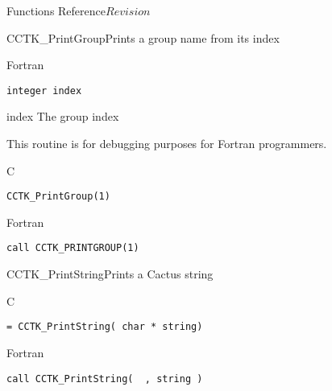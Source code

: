 \begin{cactuspart}{ Functions Reference}{}{$Revision$}
\begin{FunctionDescription}{CCTK\_PrintGroup}{Prints a group name from its index}
\begin{SynopsisSection}
\begin{Synopsis}{Fortran}
\begin{verbatim}
integer index\end{verbatim}
\end{Synopsis}
\end{SynopsisSection}
\begin{ParameterSection}
\begin{Parameter}{index}
The group index
\end{Parameter}
\end{ParameterSection}
\begin{Discussion}
This routine is for debugging purposes for Fortran programmers.
\end{Discussion}
\begin{ExampleSection}
\begin{Example}{C}
\begin{verbatim}
CCTK_PrintGroup(1)
\end{verbatim}
\end{Example}
\begin{Example}{Fortran}
\begin{verbatim}
call CCTK_PRINTGROUP(1)
\end{verbatim}
\end{Example}
\end{ExampleSection}
\end{FunctionDescription}

\begin{FunctionDescription}{CCTK\_PrintString}{Prints a Cactus string}
\label{CCTK-PrintString}
\begin{SynopsisSection}
\begin{Synopsis}{C}
\begin{verbatim}= CCTK_PrintString( char * string)\end{verbatim}
\end{Synopsis}
\begin{Synopsis}{Fortran}
\begin{verbatim}call CCTK_PrintString(  , string )


\end{verbatim}
\end{Synopsis}
\end{SynopsisSection}
\end{FunctionDescription}
\end{cactuspart}
